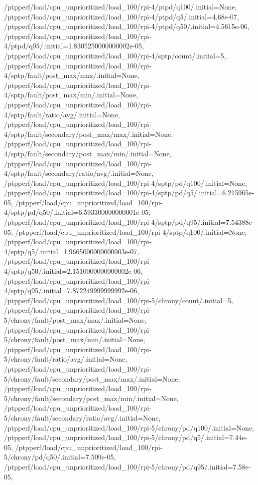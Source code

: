 {    /ptpperf/load/cpu_unprioritized/load_100/rpi-4/ptpd/q100/.initial=None,
    /ptpperf/load/cpu_unprioritized/load_100/rpi-4/ptpd/q5/.initial=4.68e-07,
    /ptpperf/load/cpu_unprioritized/load_100/rpi-4/ptpd/q50/.initial=4.5615e-06,
    /ptpperf/load/cpu_unprioritized/load_100/rpi-4/ptpd/q95/.initial=1.8305250000000002e-05,
    /ptpperf/load/cpu_unprioritized/load_100/rpi-4/sptp/count/.initial=5,
    /ptpperf/load/cpu_unprioritized/load_100/rpi-4/sptp/fault/post_max/max/.initial=None,
    /ptpperf/load/cpu_unprioritized/load_100/rpi-4/sptp/fault/post_max/min/.initial=None,
    /ptpperf/load/cpu_unprioritized/load_100/rpi-4/sptp/fault/ratio/avg/.initial=None,
    /ptpperf/load/cpu_unprioritized/load_100/rpi-4/sptp/fault/secondary/post_max/max/.initial=None,
    /ptpperf/load/cpu_unprioritized/load_100/rpi-4/sptp/fault/secondary/post_max/min/.initial=None,
    /ptpperf/load/cpu_unprioritized/load_100/rpi-4/sptp/fault/secondary/ratio/avg/.initial=None,
    /ptpperf/load/cpu_unprioritized/load_100/rpi-4/sptp/pd/q100/.initial=None,
    /ptpperf/load/cpu_unprioritized/load_100/rpi-4/sptp/pd/q5/.initial=6.215965e-05,
    /ptpperf/load/cpu_unprioritized/load_100/rpi-4/sptp/pd/q50/.initial=6.593300000000001e-05,
    /ptpperf/load/cpu_unprioritized/load_100/rpi-4/sptp/pd/q95/.initial=7.54388e-05,
    /ptpperf/load/cpu_unprioritized/load_100/rpi-4/sptp/q100/.initial=None,
    /ptpperf/load/cpu_unprioritized/load_100/rpi-4/sptp/q5/.initial=1.9665000000000003e-07,
    /ptpperf/load/cpu_unprioritized/load_100/rpi-4/sptp/q50/.initial=2.1510000000000002e-06,
    /ptpperf/load/cpu_unprioritized/load_100/rpi-4/sptp/q95/.initial=7.872249999999992e-06,
    /ptpperf/load/cpu_unprioritized/load_100/rpi-5/chrony/count/.initial=5,
    /ptpperf/load/cpu_unprioritized/load_100/rpi-5/chrony/fault/post_max/max/.initial=None,
    /ptpperf/load/cpu_unprioritized/load_100/rpi-5/chrony/fault/post_max/min/.initial=None,
    /ptpperf/load/cpu_unprioritized/load_100/rpi-5/chrony/fault/ratio/avg/.initial=None,
    /ptpperf/load/cpu_unprioritized/load_100/rpi-5/chrony/fault/secondary/post_max/max/.initial=None,
    /ptpperf/load/cpu_unprioritized/load_100/rpi-5/chrony/fault/secondary/post_max/min/.initial=None,
    /ptpperf/load/cpu_unprioritized/load_100/rpi-5/chrony/fault/secondary/ratio/avg/.initial=None,
    /ptpperf/load/cpu_unprioritized/load_100/rpi-5/chrony/pd/q100/.initial=None,
    /ptpperf/load/cpu_unprioritized/load_100/rpi-5/chrony/pd/q5/.initial=7.44e-05,
    /ptpperf/load/cpu_unprioritized/load_100/rpi-5/chrony/pd/q50/.initial=7.509e-05,
    /ptpperf/load/cpu_unprioritized/load_100/rpi-5/chrony/pd/q95/.initial=7.58e-05,
}
